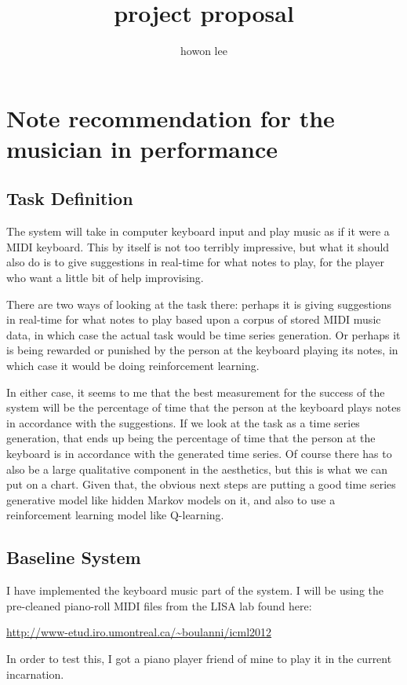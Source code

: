 \documentclass{article}
\begin{document}
\title{project proposal}
\author{howon lee}
\maketitle
\section*{Note recommendation for the musician in performance}
\subsection*{Task Definition}
The system will take in computer keyboard input and play music as if it were a MIDI keyboard. This by itself is not too terribly impressive, but what it should also do is to give suggestions in real-time for what notes to play, for the player who want a little bit of help improvising.

There are two ways of looking at the task there: perhaps it is giving suggestions in real-time for what notes to play based upon a corpus of stored MIDI music data, in which case the actual task would be time series generation. Or perhaps it is being rewarded or punished by the person at the keyboard playing its notes, in which case it would be doing reinforcement learning.

In either case, it seems to me that the best measurement for the success of the system will be the percentage of time that the person at the keyboard plays notes in accordance with the suggestions. If we look at the task as a time series generation, that ends up being the percentage of time that the person at the keyboard is in accordance with the generated time series. Of course there has to also be a large qualitative component in the aesthetics, but this is what we can put on a chart. Given that, the obvious next steps are putting a good time series generative model like hidden Markov models on it, and also to use a reinforcement learning model like Q-learning.
\subsection*{Baseline System}
I have implemented the keyboard music part of the system. I will be using the pre-cleaned piano-roll MIDI files from the LISA lab found here:

\url{http://www-etud.iro.umontreal.ca/~boulanni/icml2012}

In order to test this, I got a piano player friend of mine to play it in the current incarnation.
\end{document}
